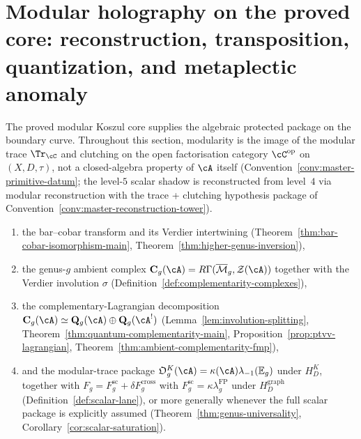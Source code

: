 \section{Modular holography on the proved core: reconstruction, transposition, quantization, and metaplectic anomaly}
\label{sec:frontier-modular-holography-platonic}

The proved modular Koszul core supplies the algebraic protected
package on the boundary curve. Throughout this section, modularity
is the image of the modular trace $\Tr_\cC$ and clutching on the open
factorisation category $\cC^{\mathrm{op}}$ on $(X,D,\tau)$, not a
closed-algebra property of $\cA$ itself
\textup{(}Convention~\textup{\ref{conv:master-primitive-datum}};
the level-$5$ scalar shadow is reconstructed from level~$4$ via
modular reconstruction with the trace + clutching hypothesis package
of Convention~\textup{\ref{conv:master-reconstruction-tower}}\textup{)}.
\begin{enumerate}[label=\textup{(\roman*)}]
\item the bar--cobar transform and its Verdier intertwining
 \textup{(}Theorem~\textup{\ref{thm:bar-cobar-isomorphism-main}},
 Theorem~\textup{\ref{thm:higher-genus-inversion}}\textup{)},
\item the genus-$g$ ambient complex
 $\mathbf C_g(\cA)=R\Gamma(\overline{\mathcal M}_g,\mathcal Z(\cA))$
 together with the Verdier involution $\sigma$
 \textup{(}Definition~\textup{\ref{def:complementarity-complexes}}\textup{)},
\item the complementary-Lagrangian decomposition
 $\mathbf C_g(\cA)\simeq \mathbf Q_g(\cA)\oplus \mathbf Q_g(\cA^!)$
 \textup{(}Lemma~\textup{\ref{lem:involution-splitting}},
 Theorem~\textup{\ref{thm:quantum-complementarity-main}},
 Proposition~\textup{\ref{prop:ptvv-lagrangian}},
 Theorem~\textup{\ref{thm:ambient-complementarity-fmp}}\textup{)},
\item and the modular-trace package
 $\mathfrak O_g^K(\cA)=\kappa(\cA)\lambda_{-1}(\mathbb E_g)$ under
 $H_D^K$, together with
 $F_g=F_g^{\mathrm{sc}}+\delta F_g^{\mathrm{cross}}$ with
 $F_g^{\mathrm{sc}}=\kappa\lambda_g^{\mathrm{FP}}$
 under $H_D^{\mathrm{graph}}$
 \textup{(}Definition~\textup{\ref{def:scalar-lane}}\textup{)},
 or more generally whenever the full
 scalar package is explicitly assumed
 \textup{(}Theorem~\textup{\ref{thm:genus-universality}},
 Corollary~\textup{\ref{cor:scalar-saturation}}\textup{)}.
\end{enumerate}
